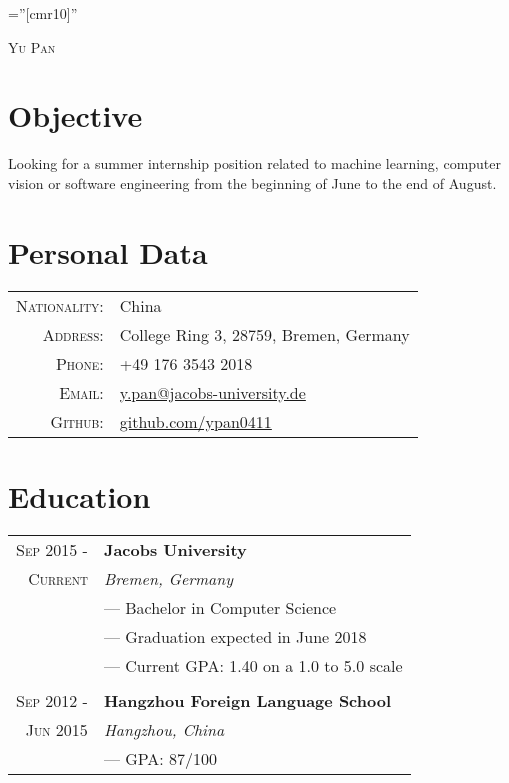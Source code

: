 \documentclass[a4paper,10pt]{article}
\begin{document}
	
	
	\pagestyle{empty} %
	
	\font\fb=''[cmr10]'' %
	
	\par{\centering
		{\huge{\textsc{Yu Pan}}}\bigskip\par}
	
	\section{Objective}
	Looking for a summer internship position related to machine learning, computer vision or software engineering from the beginning of June to the end of August.
	
	
	\section{Personal Data}
	\begin{tabular}{rl}
		\textsc{Nationality:}&China \\
		\textsc{Address:}   & College Ring 3, 28759, Bremen, Germany\\
		\textsc{Phone:}     & +49 176 3543 2018\\
		\textsc{Email:}     & \href{mailto:y.pan@jacobs-university.de}{y.pan@jacobs-university.de} \\
		\textsc{Github:} &
		\href{https://github.com/ypan0411}{github.com/ypan0411}
	\end{tabular}
	
	
	\section{Education}
	\begin{tabular}{r|l}	
		\textsc{Sep 2015 - } & \textbf{Jacobs University} \\\textsc{Current}&\emph{Bremen, Germany}
		\\& --- Bachelor in Computer Science
		\\& --- Graduation expected in June 2018
		\\& --- Current GPA: 1.40 on a 1.0 to 5.0 scale
		\\ \multicolumn{2}{c}{} \\
		\textsc{Sep 2012 - } & \textbf{Hangzhou Foreign Language School} \\\textsc{Jun 2015}&\emph{Hangzhou, China}
		\\& --- GPA: 87/100
	\end{tabular}
	
\end{document}
